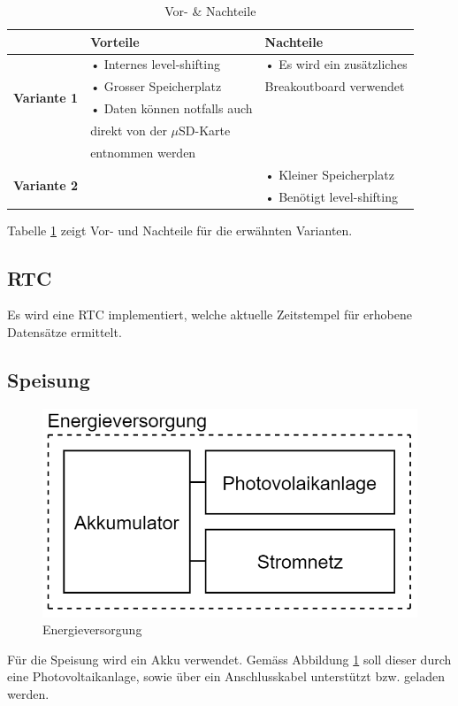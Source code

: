 \begin{table}[h]
  \centering
  \label{tab:datenspeicherung}
  \small
  \caption{Vor- \& Nachteile}
    \begin{tabular}{c|l|l}
          & \textbf{Vorteile} & \textbf{Nachteile} \\
    \toprule
    \multirow{4}[2]{*}{\textbf{Variante 1}} & • Internes level-shifting & • Es wird ein zusätzliches \\
          & • Grosser Speicherplatz & \hspace{0.3cm}Breakoutboard verwendet \\
          & • Daten können notfalls auch &  \\
          &   \hspace{0.3cm} direkt von der $\mu$SD-Karte &  \\
          &   \hspace{0.3cm} entnommen werden &  \\
    \hline
    \multirow{2}[1]{*}{\textbf{Variante 2}} &       & • Kleiner Speicherplatz \\
          &       & • Benötigt level-shifting \\
    \end{tabular}%
  \label{tab:Datenspeicherung}%
\end{table}%

Tabelle \ref{tab:Datenspeicherung} zeigt Vor- und Nachteile für die erwähnten Varianten.\\

\subsection{RTC}
Es wird eine RTC implementiert, welche aktuelle Zeitstempel für erhobene Datensätze ermittelt.\\

\subsection{Speisung}
\begin{figure}[h]
\centering
\includegraphics[scale=0.6]{graphics/Energieversorgung.PNG}
\caption{Energieversorgung}
\label{fig:Energieversorgung}
\end{figure}

Für die Speisung wird ein Akku verwendet. Gemäss Abbildung \ref{fig:Energieversorgung} soll dieser durch eine Photovoltaikanlage, sowie über ein Anschlusskabel unterstützt bzw. geladen werden.\\
